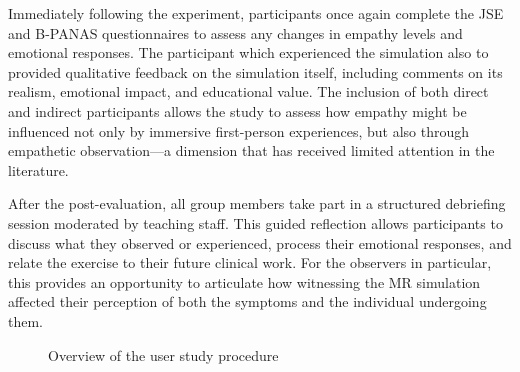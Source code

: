 \vspace{1em}

Immediately following the experiment, participants once again complete the JSE and B-PANAS questionnaires to assess any changes in empathy levels and emotional responses. The participant which experienced the simulation also to provided qualitative feedback on the simulation itself, including comments on its realism, emotional impact, and educational value. The inclusion of both direct and indirect participants allows the study to assess how empathy might be influenced not only by immersive first-person experiences, but also through empathetic observation—a dimension that has received limited attention in the literature.

\vspace{1em}

After the post-evaluation, all group members take part in a structured debriefing session moderated by teaching staff. This guided reflection allows participants to discuss what they observed or experienced, process their emotional responses, and relate the exercise to their future clinical work. For the observers in particular, this provides an opportunity to articulate how witnessing the MR simulation affected their perception of both the symptoms and the individual undergoing them.

\begin{figure}[H]
\centering
{}
\caption{Overview of the user study procedure}
\label{fig:userstudy_flowchart}
\end{figure}


